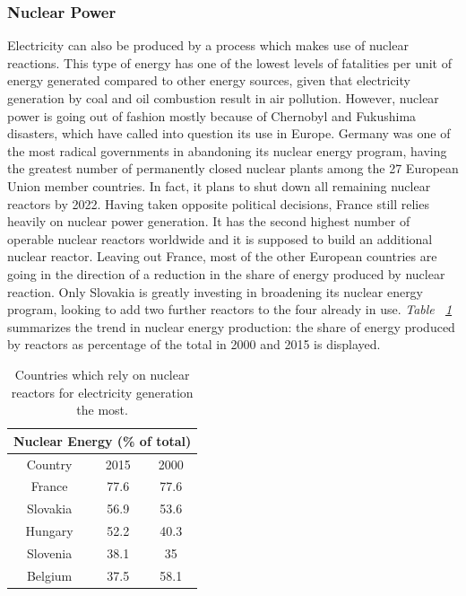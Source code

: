 \documentclass[a4paper,12pt]{book}
\begin{document}
\subsubsection*{Nuclear Power}

Electricity can also be produced by a process which makes use of nuclear reactions. This type of energy has one of the lowest levels of fatalities per unit of energy generated compared to other energy sources, given that electricity generation by coal and oil combustion result in air pollution. \cite{markandya2007electricity} However, nuclear power is going out of fashion mostly because of Chernobyl and Fukushima disasters, which have called into question its use in Europe. Germany was one of the most radical governments in abandoning its nuclear energy program, having the greatest number of permanently closed nuclear plants among the 27 European Union member countries. In fact, it plans to shut down all remaining nuclear reactors by 2022. Having taken opposite political decisions, France still relies heavily on nuclear power generation. It has the second highest number of operable nuclear reactors worldwide and it is supposed to build an additional nuclear reactor. Leaving out France, most of the other European countries are going in the direction of a reduction in the share of energy produced by nuclear reaction. Only Slovakia is greatly investing in broadening its nuclear energy program, looking to add two further reactors to the four already in use. \textit{Table ~\ref{Tab:nucE}} summarizes the trend in nuclear energy production: the share of energy produced by reactors as percentage of the total in 2000 and 2015 is displayed.

\begin{table}[tb]
\begin{center}
\begin{tabular}{|c|c|c|}
\hline
\multicolumn{3}{|c|}{Nuclear Energy (\% of total)}\\
\hline
Country & 2015 & 2000 \\
\hline
France & 77.6 & 77.6 \\
Slovakia & 56.9 & 53.6 \\
Hungary & 52.2 & 40.3 \\
Slovenia & 38.1 & 35 \\
Belgium & 37.5 & 58.1\\
\hline
\end{tabular}
\caption{Countries which rely on nuclear reactors for electricity generation the most.}
\label{Tab:nucE}
\end{center}
\end{table}
\end{document}
